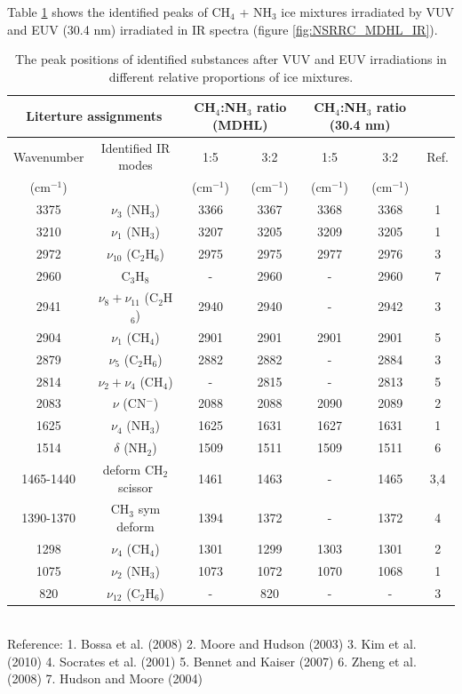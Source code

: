 Table \ref{tab:WavenumberNSRRC} shows the identified peaks of CH$_4$ + NH$_3$ ice mixtures irradiated by VUV and EUV (30.4 nm) irradiated in IR spectra (figure \ref{fig:NSRRC_MDHL_IR}).

\begin{table}[htbp]
\caption{The peak positions of identified substances after VUV and EUV irradiations in different relative proportions of ice mixtures.}
\label{tab:WavenumberNSRRC}
\begin{tabular}{ccccccc}
\hline
\hline
\multicolumn{2}{c}{Literture assignments} & \multicolumn{2}{c}{CH$_4$:NH$_3$ ratio (MDHL)} & \multicolumn{2}{c}{CH$_4$:NH$_3$ ratio (30.4 nm)} \\
\hline
Wavenumber & Identified IR modes  & 1:5 & 3:2 & 1:5 & 3:2 & Ref. \\
(cm$^{-1}$) &   & (cm$^{-1}$) & (cm$^{-1}$) & (cm$^{-1}$) & (cm$^{-1}$) &\\
\hline
3375 & $\nu_3$ (NH$_3$) & 3366 & 3367 & 3368 & 3368 & 1 \\
3210 & $\nu_1$ (NH$_3$) & 3207 & 3205 & 3209 & 3205 &1 \\
2972 & $\nu_{10}$ (C$_2$H$_6$) & 2975 & 2975 & 2977 & 2976 & 3 \\
2960 & C$_3$H$_8$ & - & 2960 & - & 2960 & 7 \\
2941 & $\nu_8+\nu_11$ (C$_2$H$_6$) & 2940 & 2940 & - & 2942 & 3 \\
2904 & $\nu_1$ (CH$_4$) & 2901 & 2901 & 2901 & 2901 & 5 \\
2879 & $\nu_5$ (C$_2$H$_6$) & 2882 & 2882 & - & 2884&  3 \\
2814 & $\nu_2+\nu_4$ (CH$_4$) & - & 2815 & - & 2813 & 5 \\
2083 & $\nu$ (CN$^-$) & 2088  & 2088 & 2090 & 2089 & 2 \\
1625 & $\nu_4$ (NH$_3$) & 1625 & 1631 & 1627 & 1631 & 1 \\
1514 & $\delta$ (NH$_2$) & 1509 & 1511 & 1509 & 1511 & 6 \\
1465-1440 & deform CH$_2$ scissor & 1461 & 1463 & - & 1465 & 3,4 \\
1390-1370 & CH$_3$ sym deform & 1394 & 1372 & - & 1372 & 4 \\
1298 & $\nu_4$ (CH$_4$) & 1301 & 1299 & 1303 & 1301 & 2 \\
1075 & $\nu_2$ (NH$_3$) & 1073 & 1072 & 1070 & 1068 & 1 \\
820 & $\nu_12$ (C$_2$H$_6$) & - & 820 & - & - & 3 \\
\hline
\end{tabular}\\
Reference: 1. Bossa et al. (2008) \cite{bossa2008carbamic} 2. Moore and Hudson (2003) \cite{moore2003infrared} 3. Kim et al. (2010) \cite{kim2010abiotic} 4. Socrates et al. (2001) \cite{socrates2001infrared} 5. Bennet and Kaiser (2007) \cite{bennett2007formation} 6. Zheng et al. (2008) \cite{zheng2008formation} 7. Hudson and Moore (2004) \cite{hudson2004reactions}
\end{table}


